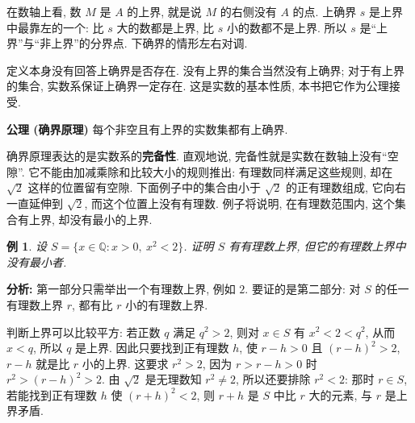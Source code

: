 \documentclass[UTF8,openany]{ctexbook}
\theoremstyle{chinesetextbook}
\newtheorem{example}{例}[section]
\begin{document}
在数轴上看, 数 $M$ 是 $A$ 的上界, 就是说 $M$ 的右侧没有 $A$ 的点. 上确界 $s$ 是上界中最靠左的一个: 比 $s$ 大的数都是上界, 比 $s$ 小的数都不是上界. 所以 $s$ 是“上界”与“非上界”的分界点. 下确界的情形左右对调.

定义本身没有回答上确界是否存在. 没有上界的集合当然没有上确界; 对于有上界的集合, 实数系保证上确界一定存在. 这是实数的基本性质, 本书把它作为公理接受.

\par\indent\textbf{公理 (确界原理)} 每个非空且有上界的实数集都有上确界.

确界原理表达的是实数系的\textbf{完备性}. 直观地说, 完备性就是实数在数轴上没有“空隙”. 它不能由加减乘除和比较大小的规则推出: 有理数同样满足这些规则, 却在 $\sqrt2$ 这样的位置留有空隙. 下面例子中的集合由小于 $\sqrt2$ 的正有理数组成, 它向右一直延伸到 $\sqrt2$, 而这个位置上没有有理数. 例子将说明, 在有理数范围内, 这个集合有上界, 却没有最小的上界.
\begin{example}
设 $S=\{x\in\mathbb Q:x>0,\ x^2<2\}$. 证明 $S$ 有有理数上界, 但它的有理数上界中没有最小者.
\end{example}
\par\indent\textbf{分析:} 第一部分只需举出一个有理数上界, 例如 $2$. 要证的是第二部分: 对 $S$ 的任一有理数上界 $r$, 都有比 $r$ 小的有理数上界.

判断上界可以比较平方: 若正数 $q$ 满足 $q^2>2$, 则对 $x\in S$ 有 $x^2<2<q^2$, 从而 $x<q$, 所以 $q$ 是上界. 因此只要找到正有理数 $h$, 使 $r-h>0$ 且 $(r-h)^2>2$, $r-h$ 就是比 $r$ 小的上界. 这要求 $r^2>2$, 因为 $r>r-h>0$ 时 $r^2>(r-h)^2>2$. 由 $\sqrt2$ 是无理数知 $r^2\ne2$, 所以还要排除 $r^2<2$: 那时 $r\in S$, 若能找到正有理数 $h$ 使 $(r+h)^2<2$, 则 $r+h$ 是 $S$ 中比 $r$ 大的元素, 与 $r$ 是上界矛盾.
\end{document}
